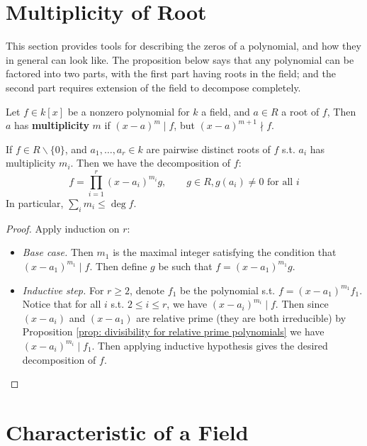 \documentclass{article}
\begin{document}
\section{Multiplicity of Root}

\textstart
This section provides tools for describing the zeros of a polynomial, and how they in general can look like. The proposition below says that any polynomial can be factored into two parts, with the first part having roots in the field; and the second part requires extension of the field to decompose completely. 

\begin{definition}[Multiplicity]
    Let $f \in k[x]$ be a nonzero polynomial for $k$ a field, and $a \in R$ a root of $f$, Then $a$ has \textbf{multiplicity} $m$ if $(x - a)^m \mid f$, but $(x - a)^{m + 1} \nmid f$.
\end{definition}

\begin{proposition}
    If $f \in R \smallsetminus \{0\}$, and $a_1, \dots, a_r \in k$ are pairwise distinct roots of $f$ s.t. $a_i$ has multiplicity $m_i$. Then we have the decomposition of $f$: 
    \[
        f = \prod_{i = 1}^r (x - a_i)^{m_i} g, \qquad g \in R, \text{$g(a_i) \neq 0$ for all $i$}
    \]
    In particular, $\sum_{i} m_i \leq \deg f$.
\end{proposition}

\begin{proof}
    Apply induction on $r$: 
    \begin{itemize}
        \item \emph{Base case.} Then $m_1$ is the maximal integer satisfying the condition that $(x - a_1)^{m_1} \mid f$. Then define $g$ be such that $f = (x - a_1)^{m_1} g$. 
        \item \emph{Inductive step.} For $r \geq 2$,  denote $f_1$ be the polynomial s.t. $f = (x - a_1)^{m_1} f_1$. Notice that for all $i$ s.t. $2 \leq i \leq r$, we have $(x - a_i)^{m_i} \mid f$. Then since $(x - a_i)$ and $(x - a_1)$ are relative prime (they are both irreducible) by Proposition \ref{prop: divisibility for relative prime polynomials} we have $(x - a_i)^{m_i} \mid f_1$. Then applying inductive hypothesis gives the desired decomposition of $f$. 
    \end{itemize}
\end{proof}

\section{Characteristic of a Field}
\end{document}
